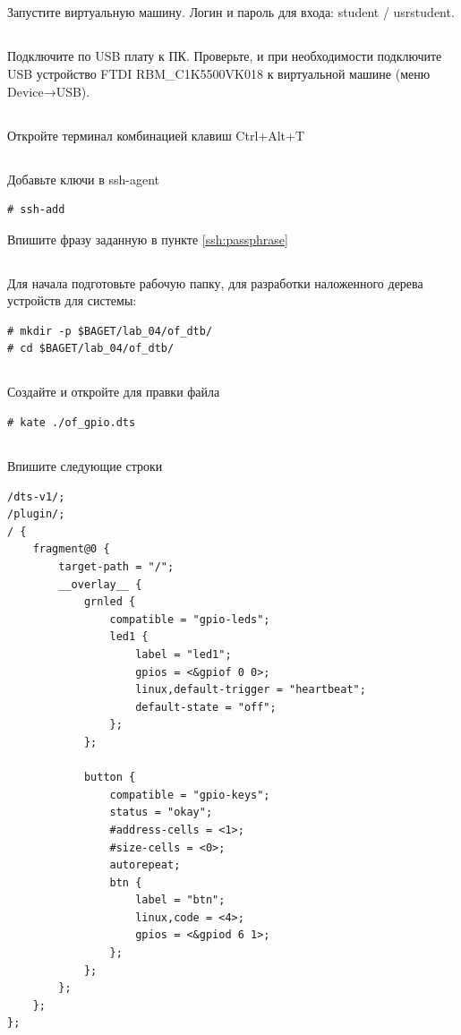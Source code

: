 \subsection{} Запустите виртуальную машину. Логин и пароль для входа: student / usrstudent.

\subsection{} Подключите по USB плату к ПК. Проверьте, и при необходимости подключите USB устройство FTDI RBM\_C1K5500VK018 к виртуальной машине (меню Device→USB).

\subsection{} Откройте терминал комбинацией клавиш Ctrl+Alt+T

\subsection{} Добавьте ключи в ssh-agent
\begin{lstlisting}[style=bash]
	# ssh-add
\end{lstlisting}
Впишите фразу заданную в пункте \ref{ssh:passphrase}

\subsection{} Для начала подготовьте рабочую папку, для разработки наложенного дерева устройств для системы: 
\begin{lstlisting}[style=bash]
# mkdir -p $BAGET/lab_04/of_dtb/
# cd $BAGET/lab_04/of_dtb/
\end{lstlisting}

\subsection{} Создайте и откройте для правки файла 
\begin{lstlisting}[style=bash]
# kate ./of_gpio.dts
\end{lstlisting}

\subsection{}Впишите следующие строки
\begin{lstlisting}[style=stdout]
/dts-v1/;
/plugin/;
/ {
	fragment@0 {
		target-path = "/";
		__overlay__ {
			grnled {
				compatible = "gpio-leds";
				led1 {
					label = "led1";
					gpios = <&gpiof 0 0>;
					linux,default-trigger = "heartbeat";
					default-state = "off";
				};
			};
			
			button {
				compatible = "gpio-keys";
				status = "okay";
				#address-cells = <1>;
				#size-cells = <0>;
				autorepeat;
				btn {
					label = "btn";
					linux,code = <4>;
					gpios = <&gpiod 6 1>;
				};
			};
		};
	};
};
\end{lstlisting}

